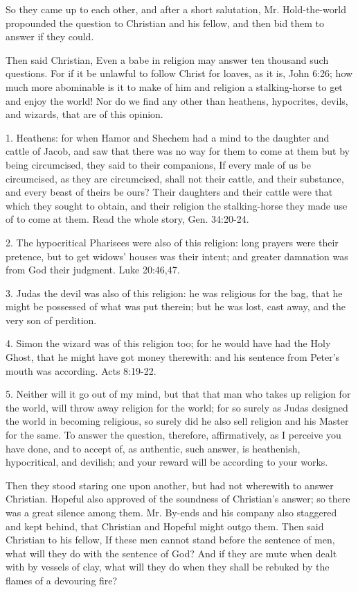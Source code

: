 So they came up to each other, and after a short salutation, Mr. Hold-the-world propounded the question to Christian and his fellow, and then bid them to answer if they could.

Then said Christian, Even a babe in religion may answer ten thousand such questions. For if it be unlawful to follow Christ for loaves, as it is, John 6:26; how much more abominable is it to make of him and religion a stalking-horse to get and enjoy the world! Nor do we find any other than heathens, hypocrites, devils, and wizards, that are of this opinion.

1. Heathens: for when Hamor and Shechem had a mind to the daughter and cattle of Jacob, and saw that there was no way for them to come at them but by being circumcised, they said to their companions, If every male of us be circumcised, as they are circumcised, shall not their cattle, and their substance, and every beast of theirs be ours? Their daughters and their cattle were that which they sought to obtain, and their religion the stalking-horse they made use of to come at them. Read the whole story, Gen. 34:20-24.

2. The hypocritical Pharisees were also of this religion: long prayers were their pretence, but to get widows' houses was their intent; and greater damnation was from God their judgment. Luke 20:46,47.

3. Judas the devil was also of this religion: he was religious for the bag, that he might be possessed of what was put therein; but he was lost, cast away, and the very son of perdition.

4. Simon the wizard was of this religion too; for he would have had the Holy Ghost, that he might have got money therewith: and his sentence from Peter's mouth was according. Acts 8:19-22.

5. Neither will it go out of my mind, but that that man who takes up religion for the world, will throw away religion for the world; for so surely as Judas designed the world in becoming religious, so surely did he also sell religion and his Master for the same. To answer the question, therefore, affirmatively, as I perceive you have done, and to accept of, as authentic, such answer, is heathenish, hypocritical, and devilish; and your reward will be according to your works.

Then they stood staring one upon another, but had not wherewith to answer Christian. Hopeful also approved of the soundness of Christian's answer; so there was a great silence among them. Mr. By-ends and his company also staggered and kept behind, that Christian and Hopeful might outgo them. Then said Christian to his fellow, If these men cannot stand before the sentence of men, what will they do with the sentence of God? And if they are mute when dealt with by vessels of clay, what will they do when they shall be rebuked by the flames of a devouring fire?

